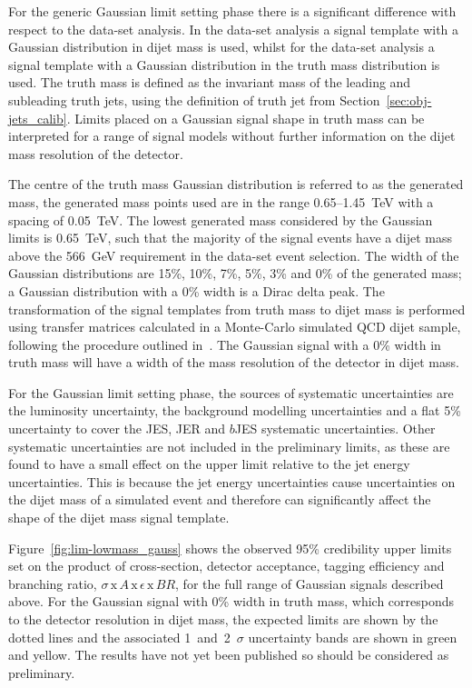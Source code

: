 \clearpage

For the generic Gaussian limit setting phase there is a significant difference
with respect to the \summer{} data-set analysis.
In the \summer{} data-set analysis a signal template with a Gaussian distribution in dijet mass is used,
whilst for the \lm{} data-set analysis a signal template with a Gaussian distribution in the truth mass distribution is used.
The truth mass is defined as the invariant mass of the leading and subleading truth jets,
using the definition of truth jet from Section~\ref{sec:obj-jets_calib}.
Limits placed on a Gaussian signal shape in truth mass can be interpreted for a range of signal models without
further information on the dijet mass resolution of the detector.

The centre of the truth mass Gaussian distribution is referred to as the generated mass,
the generated mass points used are in the range 0.65--1.45~TeV with a spacing of 0.05~TeV.
The lowest generated mass considered by the Gaussian limits is 0.65~TeV,
such that the majority of the signal events have a dijet mass above the 566~GeV requirement in the \lm{} data-set event selection.
The width of the Gaussian distributions are 15\%, 10\%, 7\%, 5\%, 3\% and 0\% of the generated mass;
a Gaussian distribution with a 0\% width is a Dirac delta peak.
The transformation of the signal templates from truth mass to dijet mass is performed using
transfer matrices calculated in a Monte-Carlo simulated QCD dijet sample,
following the procedure outlined in~\cite{dijet-mori17_paper}.
The Gaussian signal with a 0\% width in truth mass will have
a width of the mass resolution of the detector in dijet mass.

For the Gaussian limit setting phase, the sources of systematic uncertainties
are the luminosity uncertainty,
the background modelling uncertainties and a flat 5\% uncertainty to cover
the JES, JER and $b$JES systematic uncertainties.
Other systematic uncertainties are not included in the preliminary limits,
as these are found to have a small effect on the upper limit relative to the jet energy uncertainties.
This is because the jet energy uncertainties cause uncertainties on the dijet mass of a simulated event and
therefore can significantly affect the shape of the dijet mass signal template.

Figure~\ref{fig:lim-lowmass_gauss} shows the observed 95\% credibility upper limits set 
on the product of cross-section, detector acceptance, tagging efficiency and branching ratio,
$\sigma\,\text{x}\,\mathit{A}\,\text{x}\,\epsilon\,\text{x}\,\mathit{BR}$,
for the full range of Gaussian signals described above.
For the Gaussian signal with 0\% width in truth mass, which corresponds to the detector resolution in dijet mass,
the expected limits are shown by the dotted lines and the associated 1~and~2~$\sigma$ uncertainty bands are shown in green and yellow.
The results have not yet been published so should be considered as preliminary.

